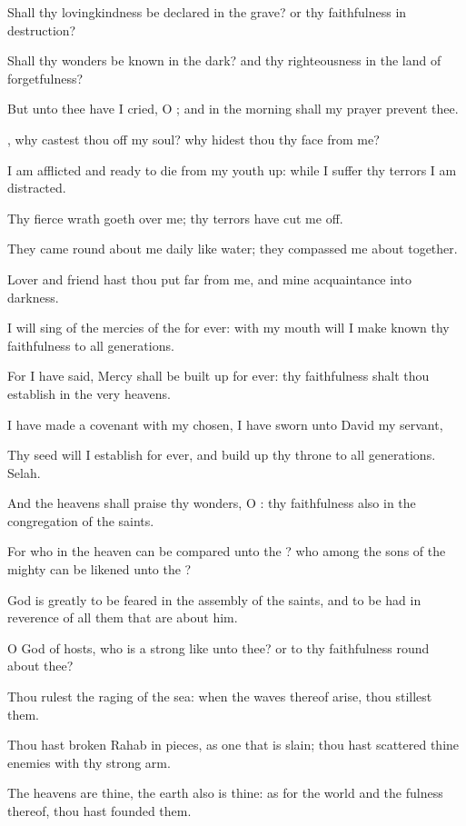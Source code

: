 \Verse Shall thy lovingkindness be declared in the grave? or thy faithfulness in destruction?

\Verse Shall thy wonders be known in the dark? and thy righteousness in the land of forgetfulness?

\Verse But unto thee have I cried, O \LORD; and in the morning shall my prayer prevent thee.

\Verse \LORD, why castest thou off my soul? why hidest thou thy face from me?

\Verse I am afflicted and ready to die from my youth up: while I suffer thy terrors I am distracted.

\Verse Thy fierce wrath goeth over me; thy terrors have cut me off.

\Verse They came round about me daily like water; they compassed me about together.

\Verse Lover and friend hast thou put far from me, and mine acquaintance into darkness.




\Chapter
\Verse I will sing of the mercies of the \LORD for ever: with my mouth will I make known thy faithfulness to all generations.

\Verse For I have said, Mercy shall be built up for ever: thy faithfulness shalt thou establish in the very heavens.

\Verse I have made a covenant with my chosen, I have sworn unto David my servant,

\Verse Thy seed will I establish for ever, and build up thy throne to all generations. Selah.

\Verse And the heavens shall praise thy wonders, O \LORD: thy faithfulness also in the congregation of the saints.

\Verse For who in the heaven can be compared unto the \LORD? who among the sons of the mighty can be likened unto the \LORD?

\Verse God is greatly to be feared in the assembly of the saints, and to be had in reverence of all them that are about him.

\Verse O \LORD God of hosts, who is a strong \LORD like unto thee? or to thy faithfulness round about thee?

\Verse Thou rulest the raging of the sea: when the waves thereof arise, thou stillest them.

\Verse Thou hast broken Rahab in pieces, as one that is slain; thou hast scattered thine enemies with thy strong arm.

\Verse The heavens are thine, the earth also is thine: as for the world and the fulness thereof, thou hast founded them.

